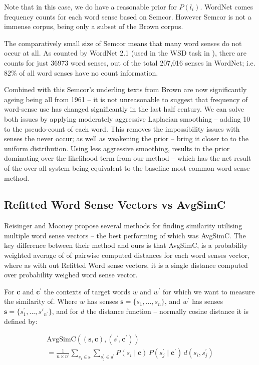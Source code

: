 \documentclass{sig-alternate}
\renewcommand{\c}{\mathbf{c}}
\newcommand{\s}{\mathbf{s}}
\begin{document}
Note that in this case, we do have a reasonable prior for $P(l_i)$.
WordNet comes frequency counts for each word sense based on Semcor\cite{tengi1998design}.
However Semcor is not a immense corpus, being only a subset of the Brown corpus.

The comparatively small size of Semcor means that many word senses do not occur at all. As counted by WordNet 2.1 (used in the WSD task in ), there are counts for just  36973 word senses, out of the total 207,016 senses in WordNet; i.e. 82\% of all word senses have no count information. 

Combined with this Semcor's underling texts from Brown are now significantly ageing being all from 1961 -- it is not unreasonable to suggest that frequency of word-sense use has changed significantly in the last half century.
We can solve both issues by applying moderately aggressive Laplacian smoothing -- adding 10 to the pseudo-count of each word. This removes the impossibility issues with senses the never occur; as well as weakening the prior -- bring it closer to to the uniform distribution. 
Using less aggressive smoothing, results in the prior dominating over the likelihood term from our method -- which has the net result of the over all system being equivalent to the baseline most common word sense method.



\subsection{Refitted Word Sense Vectors vs AvgSimC}\label{RefittedSimVsAvgSimC}
Reisinger and Mooney \cite{Reisinger2010} propose several methods for finding similarity utilising multiple word sense vectors -- the best performing of which was AvgSimC.
The key difference between their method and ours is that AvgSimC, is a probability weighted average of of pairwise computed distances for each word senses vector,
where as with out Refitted Word sense vectors, it is a single distance computed over probability weighed word sense vector.

For $\c$ and $\c^\prime$ the contexts of target words $w$ and $w^\prime$ for which we want to measure the similarity of. Where $w$ has senses $\s=\{s_1,...,s_n\}$, and $w^\prime$ has senses $\s=\{s^\prime_1,...,s\prime_{n^\prime}\}$, and for $d$ the distance function -- normally cosine distance it is defined by:


\begin{multline}
	\mathrm{AvgSimC}((\s,\c),(s^{\prime},\c^{\prime})) \\
	=  \frac{1}{n \times n^{\prime}} 
	\sum_{s_{i}\in\s}
	\sum_{s_{j}^{\prime}\in\s^{\prime}}
	P(s_{i}\mid\c)\,P(s_{j}^{\prime}\mid\c^{\prime})\,d(s_{i},s_{j}^{\prime})
\end{multline}
\end{document}
